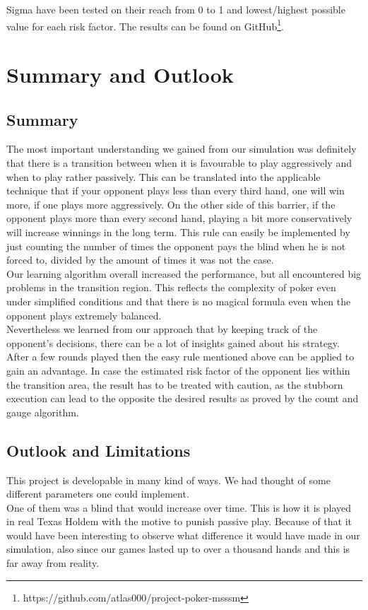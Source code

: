 \documentclass[11pt]{article}
\begin{document}
Sigma have been tested on their reach from 0 to 1 and lowest/highest possible value for each risk factor. The results can be found on GitHub\footnote{https://github.com/atlas000/project-poker-msssm}.



\section{Summary and Outlook}
\subsection{Summary}
The most important understanding we gained from our simulation was definitely that there is a transition between when it is favourable to play aggressively and when to play rather passively. This can be translated into the applicable technique that if your opponent plays less than every third hand, one will win more, if one plays more aggressively. On the other side of this barrier, if the opponent plays more than every second hand, playing a bit more conservatively will increase winnings in the long term. This rule can easily be implemented by just counting the number of times the opponent pays the blind when he is not forced to, divided by the amount of times it was not the case.\\

Our learning algorithm overall increased the performance, but all encountered big problems in the transition region. This reflects the complexity of poker even under simplified conditions and that there is no magical formula even when the opponent plays extremely balanced.\\

Nevertheless we learned from our approach that by keeping track of the opponent's decisions, there can be a lot of insights gained about his strategy. After a few rounds played then the easy rule mentioned above can be applied to gain an advantage. In case the estimated risk factor of the opponent lies within the transition area, the result has to be treated with caution, as the stubborn execution can lead to the opposite the desired results as proved by the count and gauge algorithm.\\

\subsection{Outlook and Limitations}
This project is developable in many kind of ways. We had thought of some different parameters one could implement. \\
One of them was a blind that would increase over time. This is how it is played in real Texas Holdem with the motive to punish passive play. Because of that it would have been interesting to observe what difference it would have made in our simulation, also since our games lasted up to over a thousand hands and this is far away from reality.\\
\end{document}
